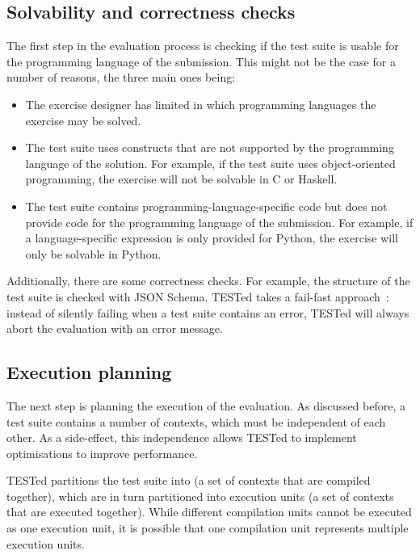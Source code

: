 \documentclass[../main]{subfiles}
\begin{document}
\subsection{Solvability and correctness checks}\label{subsec:solvability-and-correctness-checks}

The first step in the evaluation process is checking if the test suite is usable for the programming language of the submission.
This might not be the case for a number of reasons, the three main ones being:

\begin{itemize}
    \item The exercise designer has limited in which programming languages the exercise may be solved.
    \item The test suite uses constructs that are not supported by the programming language of the solution.
          For example, if the test suite uses object-oriented programming, the exercise will not be solvable in C or Haskell.
    \item The test suite contains programming-language-specific code but does not provide code for the programming language of the submission.
          For example, if a language-specific expression is only provided for Python, the exercise will only be solvable in Python.
\end{itemize}

Additionally, there are some correctness checks.
For example, the structure of the test suite is checked with JSON Schema.
TESTed takes a fail-fast approach~\autocite{shoreFailFastSoftware2004}: instead of silently failing when a test suite contains an error, TESTed will always abort the evaluation with an error message.

\subsection{Execution planning}\label{subsec:execution-planning}

The next step is planning the execution of the evaluation.
As discussed before, a test suite contains a number of contexts, which must be independent of each other.
As a side-effect, this independence allows TESTed to implement optimisations to improve performance.

TESTed partitions the test suite into  (a set of contexts that are compiled together), which are in turn partitioned into execution units (a set of contexts that are executed together).
While different compilation units cannot be executed as one execution unit, it is possible that one compilation unit represents multiple execution units.
\end{document}

